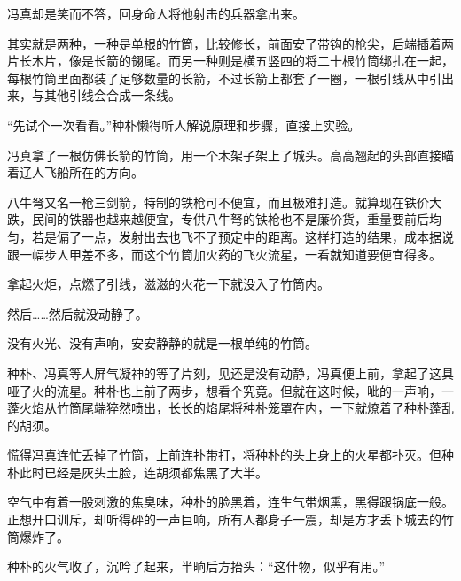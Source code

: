 冯真却是笑而不答，回身命人将他射击的兵器拿出来。

其实就是两种，一种是单根的竹筒，比较修长，前面安了带钩的枪尖，后端插着两片长木片，像是长箭的翎尾。而另一种则是横五竖四的将二十根竹筒绑扎在一起，每根竹筒里面都装了足够数量的长箭，不过长箭上都套了一圈，一根引线从中引出来，与其他引线会合成一条线。

“先试个一次看看。”种朴懒得听人解说原理和步骤，直接上实验。

冯真拿了一根仿佛长箭的竹筒，用一个木架子架上了城头。高高翘起的头部直接瞄着辽人飞船所在的方向。

八牛弩又名一枪三剑箭，特制的铁枪可不便宜，而且极难打造。就算现在铁价大跌，民间的铁器也越来越便宜，专供八牛弩的铁枪也不是廉价货，重量要前后均匀，若是偏了一点，发射出去也飞不了预定中的距离。这样打造的结果，成本据说跟一幅步人甲差不多，而这个竹筒加火药的飞火流星，一看就知道要便宜得多。

拿起火炬，点燃了引线，滋滋的火花一下就没入了竹筒内。

然后……然后就没动静了。

没有火光、没有声响，安安静静的就是一根单纯的竹筒。

种朴、冯真等人屏气凝神的等了片刻，见还是没有动静，冯真便上前，拿起了这具哑了火的流星。种朴也上前了两步，想看个究竟。但就在这时候，呲的一声响，一蓬火焰从竹筒尾端猝然喷出，长长的焰尾将种朴笼罩在内，一下就燎着了种朴蓬乱的胡须。

慌得冯真连忙丢掉了竹筒，上前连扑带打，将种朴的头上身上的火星都扑灭。但种朴此时已经是灰头土脸，连胡须都焦黑了大半。

空气中有着一股刺激的焦臭味，种朴的脸黑着，连生气带烟熏，黑得跟锅底一般。正想开口训斥，却听得砰的一声巨响，所有人都身子一震，却是方才丢下城去的竹筒爆炸了。

种朴的火气收了，沉吟了起来，半晌后方抬头：“这什物，似乎有用。”

